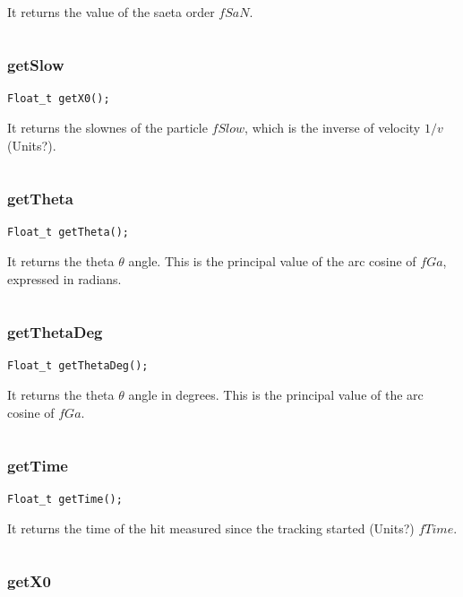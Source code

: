\documentclass[a4paper]{book}
\begin{document}
It returns the value of the saeta order $fSaN$.

\[\]

\subsubsection{getSlow}

\begin{lstlisting}[style=customc]
Float_t getX0();
\end{lstlisting}

It returns the slownes of the particle $fSlow$, which is the inverse of velocity $1/v$ (Units?).

\[\]

\subsubsection{getTheta}

\begin{lstlisting}[style=customc]
Float_t getTheta();
\end{lstlisting}

It returns the theta $\theta$ angle. This is the principal value of the arc cosine of $fGa$, expressed in radians.

\[\]

\subsubsection{getThetaDeg}

\begin{lstlisting}[style=customc]
Float_t getThetaDeg();
\end{lstlisting}

It returns the theta $\theta$ angle in degrees. This is the principal value of the arc cosine of $fGa$.

\[\]

\subsubsection{getTime}

\begin{lstlisting}[style=customc]
Float_t getTime();
\end{lstlisting}

It returns the time of the hit measured since the tracking started (Units?) $fTime$.

\[\]


\subsubsection{getX0}
\end{document}
